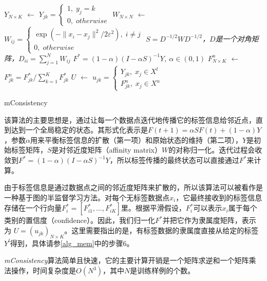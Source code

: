 \IncMargin{1em}
\begin{algorithm}
\BlankLine
\emph{$Y_{N \times K}$ $\leftarrow$ $Y_{jk}=\begin{cases}1,\; y_{j}=k \\0,\; otherwise\end{cases}$}\;
\emph{$W_{N \times N}$ $\leftarrow$ $W_{ij}=\begin{cases}\exp(-\|x_{i}-x_{j}\|^{2}/2\varepsilon^{2}),\; i\neq j \\0,\; otherwise\end{cases}$}\;
\emph{$S=D^{-1/2}WD^{-1/2}$，$D$是一个对角矩阵，$D_{ii}=\sum_{j=1}^{N}W_{ij}$}\;
\emph{$F^{*}=(1-\alpha)(I-\alpha S)^{-1}Y$, $\alpha\in(0,1)$}\;
\emph{$F^{n}_{N \times K}$ $\leftarrow$ $F^{n}_{jk}=F^{*}_{jk}/\sum_{k=1}^{K}F^{*}_{jk}$}\;
\emph{$U$ $\leftarrow$ $u_{jk}=\begin{cases}Y_{jk},\; x_{j}\in X^{l} \\F^{n}_{jk},\; x_{j}\in X^{u}\end{cases}$}\;
\caption{mConsistency}\label{alg_mem}
\end{algorithm}
\DecMargin{1em}

该算法的主要思想是，通过让每一个数据点迭代地传播它的标签信息给邻近点，直到达到一个全局稳定的状态\citep{zhou2004learning}。其形式化表示是\(F(t+1)=\alpha SF(t)+(1-\alpha)Y\)，参数\(\alpha\)用来平衡标签信息的扩散（第一项）和原始状态的维持（第二项），\(Y\)是初始标签矩阵，\(S\)是对邻近度矩阵（affinity matrix）\(W\)的对称归一化。迭代过程会收敛到\(F^{*}=(1-\alpha)(I-\alpha S)^{-1}Y\)\citep{zhou2004learning}，所以标签传播的最终状态可以直接通过\(F^{*}\)来计算。

由于标签信息是通过数据点之间的邻近度矩阵来扩散的，所以该算法可以被看作是一种基于图的半监督学习方法。对每个无标签数据点\(x_{i}\)，它最终接收到的标签信息存储在一个行向量\(F^{*}_{i}=[F^{*}_{i1},\dots,F^{*}_{iK}]\)里。根据平滑假设，\(F^{*}_{i}\)可以表示\(x_{i}\)属于每个类别的置信度（confidence）。因此，我们归一化\(F^{*}\)并把它作为隶属度矩阵，表示为 \(U=(u_{jk})_{N \times K}\)。这里需要指出的是，有标签数据的隶属度直接从给定的标签\(Y^{l}\)得到，具体请参\autoref{alg_mem}中的步骤6。

\textit{mConsistency}算法简单且快速，它的主要计算开销是一个矩阵求逆和一个矩阵乘法操作，时间复杂度是\(O(N^{3})\)，其中\(N\)是训练样例的个数。

